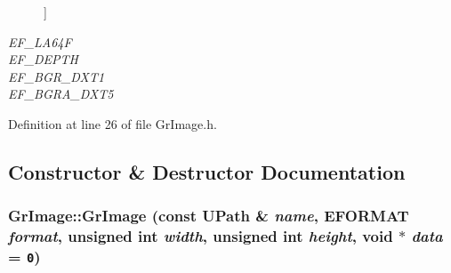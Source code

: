 \begin{CompactItemize}
\begin{Desc}
\begin{description}
{}]\item[{\em 
\hypertarget{class_gr_image_55bbf2a220e037e07616bb9c3f049786cbe17f3c0511f360dd9b53884fa0866a}{
EF\_\-LA64F}
\label{class_gr_image_55bbf2a220e037e07616bb9c3f049786cbe17f3c0511f360dd9b53884fa0866a}
}]\item[{\em 
\hypertarget{class_gr_image_55bbf2a220e037e07616bb9c3f049786b9d6d2d7c4e777cd5a0fe5a306b98b2e}{
EF\_\-DEPTH}
\label{class_gr_image_55bbf2a220e037e07616bb9c3f049786b9d6d2d7c4e777cd5a0fe5a306b98b2e}
}]\item[{\em 
\hypertarget{class_gr_image_55bbf2a220e037e07616bb9c3f0497865c5f10f876b9ae7dd73aac384de111b9}{
EF\_\-BGR\_\-DXT1}
\label{class_gr_image_55bbf2a220e037e07616bb9c3f0497865c5f10f876b9ae7dd73aac384de111b9}
}]\item[{\em 
\hypertarget{class_gr_image_55bbf2a220e037e07616bb9c3f0497869527d3b19e4c628284621359a6ac2fb1}{
EF\_\-BGRA\_\-DXT5}
\label{class_gr_image_55bbf2a220e037e07616bb9c3f0497869527d3b19e4c628284621359a6ac2fb1}
}]\end{description}
\end{Desc}



Definition at line 26 of file GrImage.h.

\subsection{Constructor \& Destructor Documentation}
\hypertarget{class_gr_image_cfe18463a50aaaadf5a059537f3aebe3}{
\subsubsection[{GrImage}]{\setlength{\rightskip}{0pt plus 5cm}GrImage::GrImage (const {\bf UPath} \& {\em name}, \/  {\bf EFORMAT} {\em format}, \/  unsigned int {\em width}, \/  unsigned int {\em height}, \/  void $\ast$ {\em data} = {\tt 0})}}
\label{class_gr_image_cfe18463a50aaaadf5a059537f3aebe3}





\end{CompactItemize}
